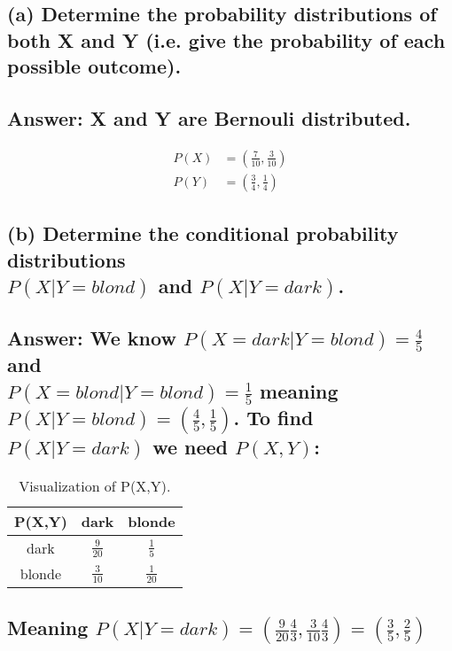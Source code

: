 \documentclass[11px]{article}
\begin{document}
\subsection*{\normalfont (a) Determine the probability distributions of both X and Y (i.e. give the probability of each possible outcome).}

\subsection*{Answer: X and Y are Bernouli distributed.}

\begin{equation}
\begin{split}
P(X) & = (\frac{7}{10}, \frac{3}{10}) \\
P(Y) & = (\frac{3}{4}, \frac{1}{4})
\end{split}    
\end{equation}

\subsection*{\normalfont(b) Determine the conditional probability distributions \\ \(P(X|Y = blond)\) and \(P(X|Y = dark)\).}

\subsection*{Answer: We know $P(X = dark|Y = blond) = \frac{4}{5}$ and \\ $P(X = blond|Y = blond) = \frac{1}{5}$ meaning $P(X|Y = blond) = (\frac{4}{5},\frac{1}{5})$. To find $P(X|Y = dark)$ we need $P(X,Y)$:}

\begin{table}[ht]
\centering
\begin{adjustbox}{width=0.5\linewidth}
\begin{tabular}{|c|c|c|}
\hline
P(X,Y) & dark & blonde\\ \hline
dark & \(\frac{9}{20}\) & \(\frac{1}{5}\)\\ \hline
blonde & \(\frac{3}{10}\) & \(\frac{1}{20}\)\\ \hline
\end{tabular}
\end{adjustbox}
\caption{Visualization of P(X,Y).} 
\end{table}

\subsection*{Meaning \(P(X|Y = dark) = (\frac{9}{20}\frac{4}{3}, \frac{3}{10}\frac{4}{3}) = (\frac{3}{5}, \frac{2}{5})\)}
\end{document}
